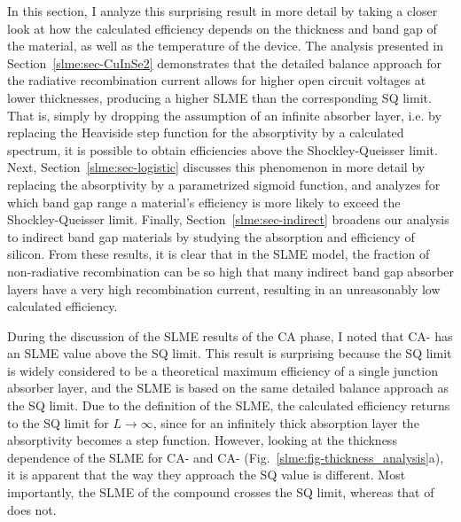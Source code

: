 \begin{refsection}
In this 
section, I analyze this surprising result in more detail by taking a closer 
look at how the calculated efficiency depends on the thickness and band gap of 
the material, as well as the temperature of the device. The analysis presented in Section~\ref{slme:sec-CuInSe2} demonstrates that the 
detailed balance approach for the radiative recombination current allows for 
higher open circuit voltages at lower thicknesses, producing a higher SLME 
than the corresponding SQ limit. That is, simply by dropping the assumption of 
an infinite absorber layer, i.e. by replacing the Heaviside step function for 
the absorptivity by a calculated spectrum, it is possible to obtain efficiencies above the 
Shockley-Queisser limit. Next, Section~\ref{slme:sec-logistic} discusses this 
phenomenon in more detail by 
replacing the absorptivity by a parametrized sigmoid function, and analyzes for 
which band gap range a material's efficiency is more likely to exceed the 
Shockley-Queisser limit. Finally, Section~\ref{slme:sec-indirect} broadens our analysis to indirect band gap 
materials by studying the absorption and efficiency of silicon. From these results, it is clear that 
in the SLME model, the fraction of non-radiative recombination can be so high that 
many indirect band gap absorber layers have a very high recombination 
current, resulting in an unreasonably low calculated efficiency.  
 
 
During the discussion of the SLME results of the CA phase, I noted that 
\mbox{CA-} has an SLME value above the SQ limit. This result is 
surprising because the SQ limit is widely considered to be a theoretical 
maximum efficiency of a single junction absorber layer, and the SLME is based 
on the same detailed balance approach as the SQ limit. Due to the definition 
of the SLME, the calculated efficiency returns to the SQ limit for \mbox{$L 
\rightarrow \infty$}, since for an infinitely thick absorption layer the 
absorptivity becomes a step function. However, looking at the thickness 
dependence of the SLME for \mbox{CA-} and \mbox{CA-} 
(Fig.~\ref{slme:fig-thickness_analysis}a), it is apparent that the way they approach the SQ value 
is different. Most importantly, the SLME of the compound  crosses 
the SQ limit, whereas that of  does not. 


\end{refsection}
